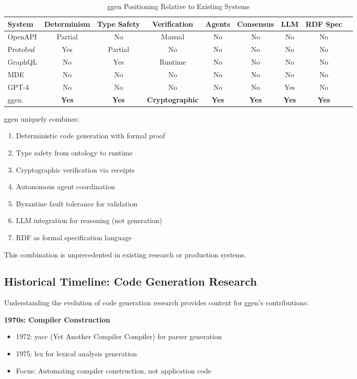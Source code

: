 \begin{table}[h]
\centering
\caption{ggen Positioning Relative to Existing Systems}
\label{tab:positioning}
\small
\begin{tabular}{lcccccccc}
\toprule
\textbf{System} & \textbf{Determinism} & \textbf{Type Safety} & \textbf{Verification} & \textbf{Agents} & \textbf{Consensus} & \textbf{LLM} & \textbf{RDF Spec} \\
\midrule
OpenAPI & Partial & No & Manual & No & No & No & No \\
Protobuf & Yes & Partial & No & No & No & No & No \\
GraphQL & No & Yes & Runtime & No & No & No & No \\
MDE & No & No & No & No & No & No & No \\
GPT-4 & No & No & No & No & No & Yes & No \\
ggen & \textbf{Yes} & \textbf{Yes} & \textbf{Cryptographic} & \textbf{Yes} & \textbf{Yes} & \textbf{Yes} & \textbf{Yes} \\
\bottomrule
\end{tabular}
\end{table}

ggen uniquely combines:
\begin{enumerate}
    \item Deterministic code generation with formal proof
    \item Type safety from ontology to runtime
    \item Cryptographic verification via receipts
    \item Autonomous agent coordination
    \item Byzantine fault tolerance for validation
    \item LLM integration for reasoning (not generation)
    \item RDF as formal specification language
\end{enumerate}

This combination is unprecedented in existing research or production systems.

\subsection{Historical Timeline: Code Generation Research}

Understanding the evolution of code generation research provides context for ggen's contributions:

\textbf{1970s: Compiler Construction}
\begin{itemize}
    \item 1972: yacc (Yet Another Compiler Compiler) for parser generation
    \item 1975: lex for lexical analysis generation
    \item Focus: Automating compiler construction, not application code
\end{itemize}

